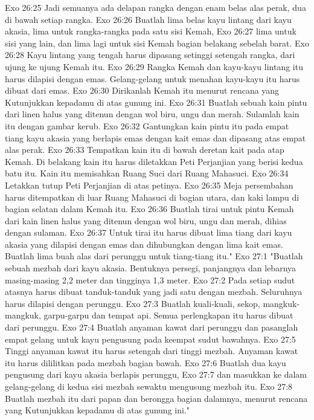 Exo 26:25  Jadi semuanya ada delapan rangka dengan enam belas alas perak, dua di bawah setiap rangka.
Exo 26:26  Buatlah lima belas kayu lintang dari kayu akasia, lima untuk rangka-rangka pada satu sisi Kemah,
Exo 26:27  lima untuk sisi yang lain, dan lima lagi untuk sisi Kemah bagian belakang sebelah barat.
Exo 26:28  Kayu lintang yang tengah harus dipasang setinggi setengah rangka, dari ujung ke ujung Kemah itu.
Exo 26:29  Rangka Kemah dan kayu-kayu lintang itu harus dilapisi dengan emas. Gelang-gelang untuk menahan kayu-kayu itu harus dibuat dari emas.
Exo 26:30  Dirikanlah Kemah itu menurut rencana yang Kutunjukkan kepadamu di atas gunung ini.
Exo 26:31  Buatlah sebuah kain pintu dari linen halus yang ditenun dengan wol biru, ungu dan merah. Sulamlah kain itu dengan gambar kerub.
Exo 26:32  Gantungkan kain pintu itu pada empat tiang kayu akasia yang berlapis emas dengan kait emas dan dipasang atas empat alas perak.
Exo 26:33  Tempatkan kain itu di bawah deretan kait pada atap Kemah. Di belakang kain itu harus diletakkan Peti Perjanjian yang berisi kedua batu itu. Kain itu memisahkan Ruang Suci dari Ruang Mahasuci.
Exo 26:34  Letakkan tutup Peti Perjanjian di atas petinya.
Exo 26:35  Meja persembahan harus ditempatkan di luar Ruang Mahasuci di bagian utara, dan kaki lampu di bagian selatan dalam Kemah itu.
Exo 26:36  Buatlah tirai untuk pintu Kemah dari kain linen halus yang ditenun dengan wol biru, ungu dan merah, dihias dengan sulaman.
Exo 26:37  Untuk tirai itu harus dibuat lima tiang dari kayu akasia yang dilapisi dengan emas dan dihubungkan dengan lima kait emas. Buatlah lima buah alas dari perunggu untuk tiang-tiang itu."
Exo 27:1  "Buatlah sebuah mezbah dari kayu akasia. Bentuknya persegi, panjangnya dan lebarnya masing-masing 2,2 meter dan tingginya 1,3 meter.
Exo 27:2  Pada setiap sudut atasnya harus dibuat tanduk-tanduk yang jadi satu dengan mezbah. Seluruhnya harus dilapisi dengan perunggu.
Exo 27:3  Buatlah kuali-kuali, sekop, mangkuk-mangkuk, garpu-garpu dan tempat api. Semua perlengkapan itu harus dibuat dari perunggu.
Exo 27:4  Buatlah anyaman kawat dari perunggu dan pasanglah empat gelang untuk kayu pengusung pada keempat sudut bawahnya.
Exo 27:5  Tinggi anyaman kawat itu harus setengah dari tinggi mezbah. Anyaman kawat itu harus dililitkan pada mezbah bagian bawah.
Exo 27:6  Buatlah dua kayu pengusung dari kayu akasia berlapis perunggu,
Exo 27:7  dan masukkan ke dalam gelang-gelang di kedua sisi mezbah sewaktu mengusung mezbah itu.
Exo 27:8  Buatlah mezbah itu dari papan dan berongga bagian dalamnya, menurut rencana yang Kutunjukkan kepadamu di atas gunung ini."
